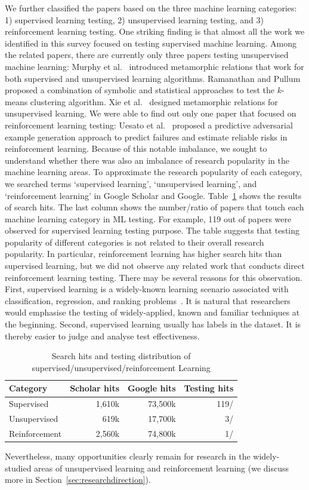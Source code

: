 We further classified the papers based on the three machine learning categories: 
1) supervised learning testing, 2) unsupervised learning testing, and 3) reinforcement learning testing.
One striking finding is that almost all the work we identified in this survey focused on testing supervised machine learning. 
Among the \papernum related papers, there are currently only three papers testing unsupervised machine learning: 
Murphy et al.~ introduced metamorphic relations that work for both supervised and unsupervised learning algorithms.
Ramanathan and Pullum~ proposed  a combination of symbolic and statistical approaches to test the $k$-means clustering algorithm.
Xie et al.~ designed metamorphic relations for unsupervised learning.
We were able to find out only one paper that focused on reinforcement learning testing: 
Uesato et al.~ proposed a predictive adversarial example generation approach to predict failures and estimate reliable risks in reinforcement learning.
Because of this notable imbalance, we sought to understand whether there was also an imbalance of research popularity in the machine learning areas.
To approximate the research popularity of each category, we searched terms `supervised learning', `unsupervised learning', and `reinforcement learning' in Google Scholar and Google.
Table~\ref{tab:researchhit} shows the results of search hits.
The last column shows the number/ratio of papers that touch each machine learning category in ML testing.
For example, 119 out of \papernum papers were observed for supervised learning testing purpose.
The table suggests that testing popularity of different categories is not related to their overall research popularity. 
In particular, reinforcement learning has higher search hits than supervised learning, but we did not observe any related work that conducts direct reinforcement learning testing.
There may be several reasons for this observation.
First, supervised learning is a widely-known learning scenario
associated with classification, regression, and ranking problems~. 
It is natural that researchers would emphasise the testing of widely-applied, known and familiar techniques at the beginning.
Second, supervised learning usually has labels in the dataset. 
It is thereby easier to judge and analyse test effectiveness.
\begin{table}[t]\small	
	\center
	\caption{\label{tab:researchhit}Search hits and testing distribution of supervised/unsupervised/reinforcement Learning }
	\begin{tabular}{lrrr}
		\toprule
		Category&Scholar hits& Google hits& Testing hits\\ \hline
		Supervised&1,610k&73,500k&119/\papernum \\
		Unsupervised&619k&17,700k&3/\papernum \\ 
		Reinforcement&2,560k&74,800k&1/\papernum \\
		\bottomrule		
	\end{tabular}
\end{table}
Nevertheless, many opportunities clearly remain for research in the widely-studied areas of unsupervised learning and reinforcement learning (we discuss more in Section~\ref{sec:researchdirection}).

